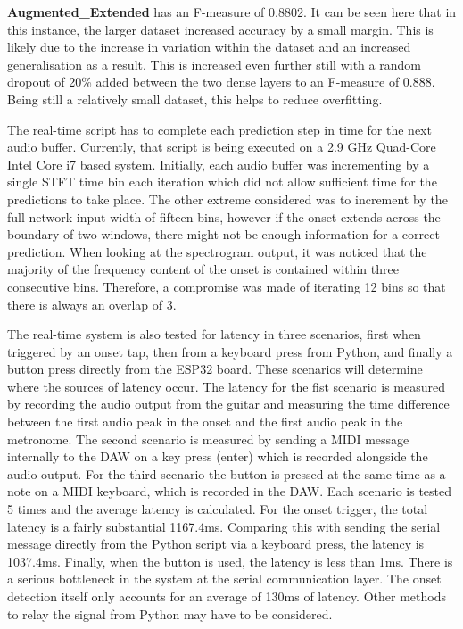 \documentclass[conference]{IEEEtran}
\begin{document}
\textbf{Augmented\_Extended} has an F-measure of 0.8802. It can be seen here that in this instance, the larger dataset increased accuracy by a small margin. This is likely due to the increase
in variation within the dataset and an increased generalisation as a result. 
This is increased even further still with a random dropout of 20\% added between the two dense layers to an F-measure of 0.888. Being still a relatively small dataset, this helps to reduce overfitting.

The real-time script has to complete each prediction step in time for the next audio buffer. Currently, that script is being executed on a 2.9 GHz Quad-Core Intel Core i7 based system. Initially, each audio buffer was incrementing
by a single STFT time bin each iteration which did not allow sufficient time for the predictions to take place. The other extreme considered was to increment by the full network input width of fifteen bins, however if the onset extends
across the boundary of two windows, there might not be enough information for a correct prediction. When looking at the spectrogram output, it was noticed that the majority of the frequency content of the onset is contained within three 
consecutive bins. Therefore, a compromise was made of iterating 12 bins so that there is always an overlap of 3.

The real-time system is also tested for latency in three scenarios, first when triggered by an onset tap, then from a keyboard press from Python, and finally a button press directly from the
ESP32 board. These scenarios will determine where the sources of latency occur. The latency for the fist scenario is measured by recording the audio output from the guitar and measuring the time difference between the first audio peak in the onset and the first audio peak in the metronome.
The second scenario is measured by sending a MIDI message internally to the DAW on a key press (enter) which is recorded alongside the audio output. For the third scenario the button is pressed at the same time as a note on a MIDI keyboard, which is recorded in the DAW. 
Each scenario is tested 5 times and the average latency is calculated. For the onset trigger, the total latency is a fairly substantial 1167.4ms. Comparing this with sending
the serial message directly from the Python script via a keyboard press, the latency is 1037.4ms. Finally, when the button is used, the latency is less than 1ms.
There is a serious bottleneck in the system at the serial communication layer. The onset detection itself only accounts for an average of 130ms of latency. Other methods to relay the signal
from Python may have to be considered.
\end{document}
